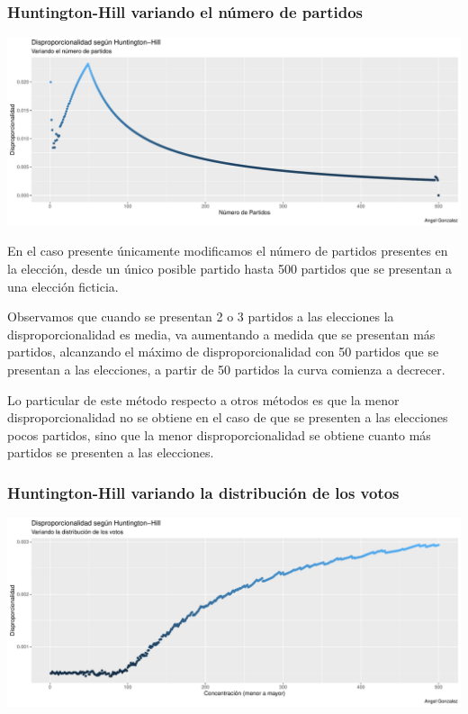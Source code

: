 \documentclass[12pt,a4paper,]{book}
\numberwithin{dummy}{section}
\theoremstyle{ocrenumbox}
\theoremstyle{blacknumex}
\theoremstyle{blacknumbox}
\theoremstyle{ocrenum}
\theoremstyle{ocrenum}
\begin{document}
\hypertarget{huntington-hill-variando-el-nuxfamero-de-partidos}{%
\subsubsection{Huntington-Hill variando el número de
partidos}\label{huntington-hill-variando-el-nuxfamero-de-partidos}}

\begin{center}\includegraphics[width=0.95\linewidth]{figurasR/unnamed-chunk-30-1} \end{center}

En el caso presente únicamente modificamos el número de partidos
presentes en la elección, desde un único posible partido hasta 500
partidos que se presentan a una elección ficticia.

Observamos que cuando se presentan 2 o 3 partidos a las elecciones la
disproporcionalidad es media, va aumentando a medida que se presentan
más partidos, alcanzando el máximo de disproporcionalidad con 50
partidos que se presentan a las elecciones, a partir de 50 partidos la
curva comienza a decrecer.

Lo particular de este método respecto a otros métodos es que la menor
disproporcionalidad no se obtiene en el caso de que se presenten a las
elecciones pocos partidos, sino que la menor disproporcionalidad se
obtiene cuanto más partidos se presenten a las elecciones.

\hypertarget{huntington-hill-variando-la-distribuciuxf3n-de-los-votos}{%
\subsubsection{Huntington-Hill variando la distribución de los
votos}\label{huntington-hill-variando-la-distribuciuxf3n-de-los-votos}}

\begin{center}\includegraphics[width=0.95\linewidth]{figurasR/unnamed-chunk-31-1} \end{center}
\end{document}
